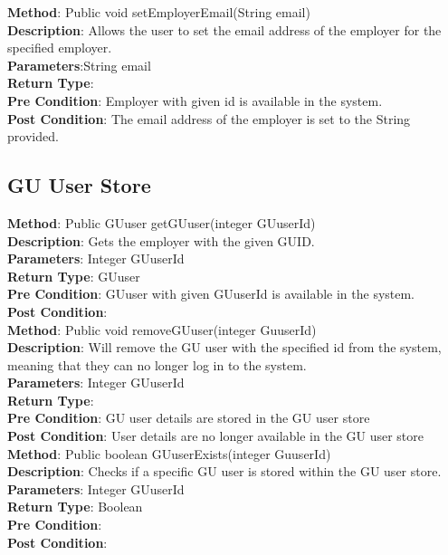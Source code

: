 \documentclass{l3deliverable}
\begin{document}
\textbf{Method}: Public void setEmployerEmail(String email)\\
\textbf{Description}: Allows the user to set the email address of the employer for the specified employer.\\
\textbf{Parameters}:String email\\
\textbf{Return Type}:\\
\textbf{Pre Condition}: Employer with given id is available in the system.\\
\textbf{Post Condition}: The email address of the employer is set to the String provided.\\

\subsection{GU User Store}

\textbf{Method}: Public GUuser getGUuser(integer GUuserId)\\
\textbf{Description}: Gets the employer with the given GUID.\\
\textbf{Parameters}: Integer GUuserId\\
\textbf{Return Type}: GUuser\\
\textbf{Pre Condition}: GUuser with given GUuserId is available in the system.\\
\textbf{Post Condition}:\\

\textbf{Method}: Public void removeGUuser(integer GuuserId)\\
\textbf{Description}: Will remove the GU user with the specified id from the system, meaning that they can no longer log in to the system.
\\
\textbf{Parameters}: Integer GUuserId\\
\textbf{Return Type}:\\
\textbf{Pre Condition}: GU user details are stored in the GU user store\\
\textbf{Post Condition}: User details are no longer available in the GU user store\\

\textbf{Method}: Public boolean GUuserExists(integer GuuserId)\\
\textbf{Description}: Checks if a specific GU user is stored within the GU user store.\\
\textbf{Parameters}: Integer GUuserId\\
\textbf{Return Type}: Boolean\\
\textbf{Pre Condition}:\\
\textbf{Post Condition}:\\
\end{document}
